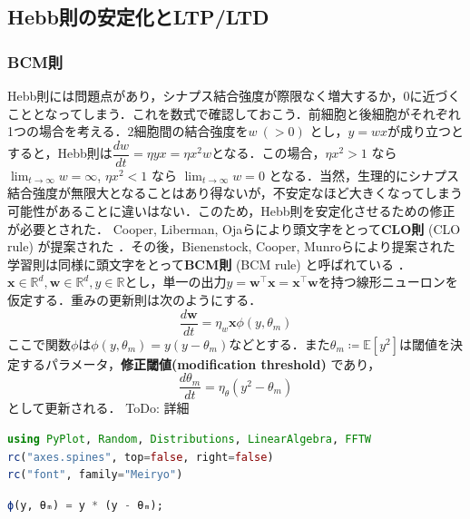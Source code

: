 \subsection{Hebb則の安定化とLTP/LTD}
\subsubsection{BCM則}
Hebb則には問題点があり，シナプス結合強度が際限なく増大するか，0に近づくこととなってしまう．これを数式で確認しておこう．前細胞と後細胞がそれぞれ1つの場合を考える．2細胞間の結合強度を$w\ (>0)$ とし，$y=wx$が成り立つとすると，Hebb則は$\dfrac{dw}{dt}=\eta yx=\eta x^2w$となる．この場合，$\eta x^2>1$ なら $\lim_{t\to\infty} w= \infty$, $\eta x^2<1$ なら $\lim_{t\to\infty} w= 0$ となる．当然，生理的にシナプス結合強度が無限大となることはあり得ないが，不安定なほど大きくなってしまう可能性があることに違いはない．このため，Hebb則を安定化させるための修正が必要とされた．
Cooper, Liberman, Ojaらにより頭文字をとって\textbf{CLO則} (CLO rule) が提案された \citep{Cooper1979-wz}．その後，Bienenstock, Cooper, Munroらにより提案された学習則は同様に頭文字をとって\textbf{BCM則} (BCM rule) と呼ばれている\citep{Bienenstock1982-km} \citep{Cooper2012-ec}．
$\mathbf{x}\in \mathbb{R}^d, \mathbf{w}\in \mathbb{R}^d, y\in \mathbb{R}$とし，単一の出力$y = \mathbf{w}^\top \mathbf{x}=\mathbf{x}^\top \mathbf{w}$を持つ線形ニューロンを仮定する．重みの更新則は次のようにする．
\begin{equation}
\frac{d\mathbf{w}}{dt} = \eta_w \mathbf{x} \phi(y, \theta_m)
\end{equation}
ここで関数$\phi$は$\phi(y, \theta_m)=y(y-\theta_m)$などとする．また$\theta_m\coloneqq \mathbb{E}[y^2]$は閾値を決定するパラメータ，\textbf{修正閾値(modification threshold)} であり，
\begin{equation}
\frac{d\theta_m}{dt} = \eta_{\theta} \left(y^2-\theta_m\right)
\end{equation}
として更新される．
ToDo: 詳細
\begin{lstlisting}[language=julia]
using PyPlot, Random, Distributions, LinearAlgebra, FFTW
rc("axes.spines", top=false, right=false)
rc("font", family="Meiryo")
\end{lstlisting}
\begin{lstlisting}[language=julia]
ϕ(y, θₘ) = y * (y - θₘ);
\end{lstlisting}
